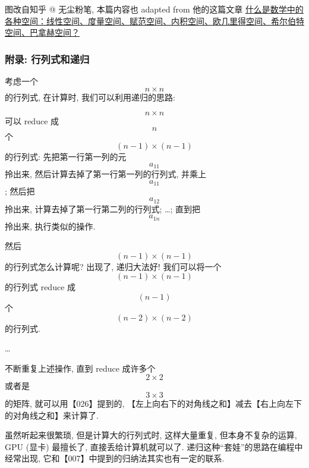 \begin{newquote}
图改自知乎 @ 无尘粉笔, 本篇内容也 adapted from 他的这篇文章
\href{https://zhuanlan.zhihu.com/p/541226732}{什么是数学中的各种空间：线性空间、度量空间、赋范空间、内积空间、欧几里得空间、希尔伯特空间、巴拿赫空间？}
\end{newquote}

\subsubsection{附录:
行列式和递归}

考虑一个 \[n\times n\] 的行列式, 在计算时, 我们可以利用递归的思路:

\[n\times n\] 可以 reduce 成 \[n\] 个 \[(n-1)\times(n-1)\] 的行列式:
先把第一行第一列的元 \[a_{11}\] 拎出来,
然后计算去掉了第一行第一列的行列式, 并乘上 \[a_{11}\]; 然后把 \[a_{12}\]
拎出来, 计算去掉了第一行第二列的行列式; \ldots; 直到把 \[a_{1n}\]
拎出来, 执行类似的操作.

然后 \[(n-1)\times(n-1)\] 的行列式怎么计算呢? 出现了, 递归大法好!
我们可以将一个 \[(n-1)\times(n-1)\] 的行列式 reduce 成 \[(n-1)\] 个
\[(n-2)\times(n-2)\] 的行列式.

\ldots{}

不断重复上述操作, 直到 reduce 成许多个 \[2\times2\] 或者是 \[3\times3\]
的矩阵, 就可以用【026】提到的,
【左上向右下的对角线之和】减去【右上向左下的对角线之和】来计算了.

虽然听起来很繁琐, 但是计算大的行列式时, 这样大量重复,
但本身不复杂的运算, GPU (显卡) 最擅长了, 直接丢给计算机就可以了.
递归这种``套娃''的思路在编程中经常出现,
它和【007】中提到的归纳法其实也有一定的联系.
